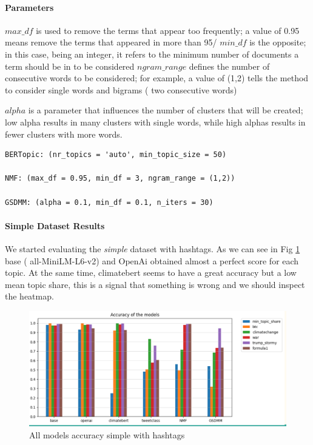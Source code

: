 \paragraph{Parameters}

$max\_df$ is used to remove the terms that appear too frequently; a value of 0.95 means remove the terms that appeared in more than 95/%
$min\_df$ is the opposite; in this case, being an integer, it refers to the minimum number of documents a term should be in to be considered 
$ngram\_range$ defines the number of consecutive words to be considered; for example, a value of (1,2) tells the method to consider single words and bigrams ( two consecutive words)

$alpha$ is a parameter that influences the number of clusters that will be created; low alpha results in many clusters with single words, while high alphas results in fewer clusters with more words.
\begin{verbatim}
BERTopic: (nr_topics = 'auto', min_topic_size = 50)

NMF: (max_df = 0.95, min_df = 3, ngram_range = (1,2))

GSDMM: (alpha = 0.1, min_df = 0.1, n_iters = 30)
\end{verbatim}


\paragraph{Simple Dataset Results}
We started evaluating the \textit{simple} dataset with hashtags. As we can see in Fig \ref{figure:supervised bar} base ( all-MiniLM-L6-v2) and OpenAi obtained almost a perfect score for each topic. At the same time, climatebert seems to have a great accuracy but a low mean topic share, this is a signal that something is wrong and we should inspect the heatmap.

\begin{figure}[h]
    \centering %
        \includegraphics[width=0.99\linewidth]{Chapter4/figures/topic_supervised_bar.png} 
    \caption{All models accuracy simple  with hashtags
    }
    \label{figure:supervised bar} %
\end{figure}

